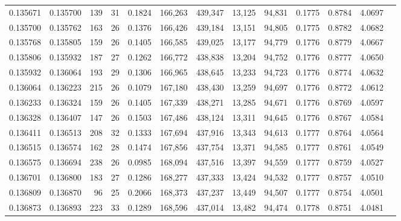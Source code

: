 \begin{tabular}{rrrrrrrrrrrrr}
0.135671 & 0.135700 &   139 &  31 &                                     0.1824 & 166,263 & 439,347 &  13,125 &  94,831 & 0.1775 & 0.8784 & 4.0697 \\
0.135700 & 0.135762 &   163 &  26 &                                     0.1376 & 166,426 & 439,184 &  13,151 &  94,805 & 0.1775 & 0.8782 & 4.0682 \\
0.135768 & 0.135805 &   159 &  26 &                                     0.1405 & 166,585 & 439,025 &  13,177 &  94,779 & 0.1776 & 0.8779 & 4.0667 \\
0.135806 & 0.135932 &   187 &  27 &                                     0.1262 & 166,772 & 438,838 &  13,204 &  94,752 & 0.1776 & 0.8777 & 4.0650 \\
0.135932 & 0.136064 &   193 &  29 &                                     0.1306 & 166,965 & 438,645 &  13,233 &  94,723 & 0.1776 & 0.8774 & 4.0632 \\
0.136064 & 0.136223 &   215 &  26 &                                     0.1079 & 167,180 & 438,430 &  13,259 &  94,697 & 0.1776 & 0.8772 & 4.0612 \\
0.136233 & 0.136324 &   159 &  26 &                                     0.1405 & 167,339 & 438,271 &  13,285 &  94,671 & 0.1776 & 0.8769 & 4.0597 \\
0.136328 & 0.136407 &   147 &  26 &                                     0.1503 & 167,486 & 438,124 &  13,311 &  94,645 & 0.1776 & 0.8767 & 4.0584 \\
0.136411 & 0.136513 &   208 &  32 &                                     0.1333 & 167,694 & 437,916 &  13,343 &  94,613 & 0.1777 & 0.8764 & 4.0564 \\
0.136515 & 0.136574 &   162 &  28 &                                     0.1474 & 167,856 & 437,754 &  13,371 &  94,585 & 0.1777 & 0.8761 & 4.0549 \\
0.136575 & 0.136694 &   238 &  26 &                                     0.0985 & 168,094 & 437,516 &  13,397 &  94,559 & 0.1777 & 0.8759 & 4.0527 \\
0.136701 & 0.136800 &   183 &  27 &                                     0.1286 & 168,277 & 437,333 &  13,424 &  94,532 & 0.1777 & 0.8757 & 4.0510 \\
0.136809 & 0.136870 &    96 &  25 &                                     0.2066 & 168,373 & 437,237 &  13,449 &  94,507 & 0.1777 & 0.8754 & 4.0501 \\
0.136873 & 0.136893 &   223 &  33 &                                     0.1289 & 168,596 & 437,014 &  13,482 &  94,474 & 0.1778 & 0.8751 & 4.0481 \\

\end{tabular}
